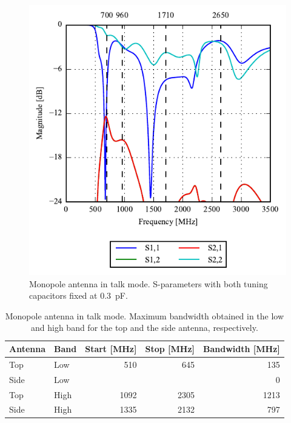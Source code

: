 \begin{figure}[htbp]
    \centering
    \includegraphics{img/tech_sol/monopole/talk_mode/sparams_talk.pdf}
    \caption{Monopole antenna in talk mode. S-parameters with both tuning capacitors fixed at \SI{0.3}{pF}.}
    \label{fig:triang_sparam_data}
\end{figure}

\begin{table}[htbp]
    \centering
    \begin{tabular}{|l|l|r|r|r|}
        \hline
        Antenna & Band & Start [MHz] & Stop [MHz] & Bandwidth [MHz] \\
        \hline
        Top     & Low  & 510 & 645  & 135 \\
        Side    & Low  & & & 0    \\
        \hline
        Top     & High & 1092 & 2305  & 1213 \\
        Side    & High & 1335  & 2132 & 797 \\
        \hline
    \end{tabular}
    \caption{Monopole antenna in talk mode. Maximum bandwidth obtained in the low and high band for the top and the side antenna, respectively.}
    \label{tab:bw_sol1talk}
\end{table}

